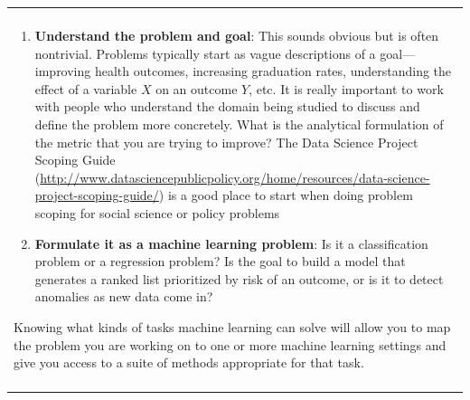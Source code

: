 \documentclass[]{krantz}
\newenvironment{F00}
    {\begin{center}
    \begin{tabular}{|p{0.9\textwidth}|}
    \hline\\
    }
    { 
    \\\\\hline
    \end{tabular} 
    \end{center}
    }
\begin{document}
\begin{F00}
\begin{enumerate}
\def\labelenumi{\arabic{enumi}.}
\item
  \textbf{Understand the problem and goal}: This sounds obvious but is
  often nontrivial. Problems typically start as vague descriptions of a
  goal---improving health outcomes, increasing graduation rates,
  understanding the effect of a variable \(X\) on an outcome \(Y\), etc.
  It is really important to work with people who understand the domain
  being studied to discuss and define the problem more concretely. What
  is the analytical formulation of the metric that you are trying to
  improve? The Data Science Project Scoping Guide
  (\url{http://www.datasciencepublicpolicy.org/home/resources/data-science-project-scoping-guide/})
  is a good place to start when doing problem scoping for social science
  or policy problems
\item
  \textbf{Formulate it as a machine learning problem}: Is it a
  classification problem or a regression problem? Is the goal to build a
  model that generates a ranked list prioritized by risk of an outcome,
  or is it to detect anomalies as new data come in?
\end{enumerate}

Knowing what kinds of tasks machine learning can solve will allow you to
map the problem you are working on to one or more machine learning
settings and give you access to a suite of methods appropriate for that
task.


\end{F00}
\end{document}
